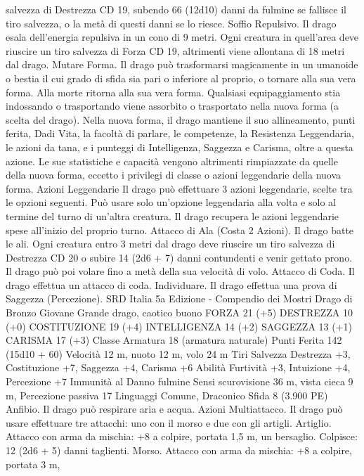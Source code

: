 \begin{multicols}{2}
salvezza di Destrezza CD 19, subendo 66 (12d10) danni da fulmine
se fallisce il tiro salvezza, o la metà di questi danni se lo riesce.
Soffio Repulsivo. Il drago esala dell’energia repulsiva in un cono di 9
metri. Ogni creatura in quell’area deve riuscire un tiro salvezza di
Forza CD 19, altrimenti viene allontana di 18 metri dal drago.
Mutare Forma. Il drago può trasformarsi magicamente in un
umanoide o bestia il cui grado di sfida sia pari o inferiore al proprio,
o tornare alla sua vera forma. Alla morte ritorna alla sua vera forma.
Qualsiasi equipaggiamento stia indossando o trasportando viene
assorbito o trasportato nella nuova forma (a scelta del drago).
Nella nuova forma, il drago mantiene il suo allineamento, punti
ferita, Dadi Vita, la facoltà di parlare, le competenze, la Resistenza
Leggendaria, le azioni da tana, e i punteggi di Intelligenza, Saggezza
e Carisma, oltre a questa azione. Le sue statistiche e capacità
vengono altrimenti rimpiazzate da quelle della nuova forma, eccetto i
privilegi di classe o azioni leggendarie della nuova forma.
Azioni Leggendarie
Il drago può effettuare 3 azioni leggendarie, scelte tra le opzioni
seguenti. Può usare solo un’opzione leggendaria alla volta e solo
al termine del turno di un’altra creatura. Il drago recupera le
azioni leggendarie spese all’inizio del proprio turno.
Attacco di Ala (Costa 2 Azioni). Il drago batte le ali. Ogni
creatura entro 3 metri dal drago deve riuscire un tiro salvezza di
Destrezza CD 20 o subire 14 (2d6 + 7) danni contundenti e venir
gettato prono. Il drago può poi volare fino a metà della sua
velocità di volo.
Attacco di Coda. Il drago effettua un attacco di coda.
Individuare. Il drago effettua una prova di Saggezza
(Percezione).
SRD Italia 5a Edizione - Compendio dei Mostri
Drago di Bronzo Giovane
Grande drago, caotico buono
FORZA 21 (+5)
DESTREZZA 10 (+0)
COSTITUZIONE 19 (+4)
INTELLIGENZA 14 (+2)
SAGGEZZA 13 (+1)
CARISMA 17 (+3)
Classe Armatura 18 (armatura naturale)
Punti Ferita 142 (15d10 + 60)
Velocità 12 m, nuoto 12 m, volo 24 m
Tiri Salvezza Destrezza +3, Costituzione +7, Saggezza +4,
Carisma +6
Abilità Furtività +3, Intuizione +4, Percezione +7
Immunità al Danno fulmine
Sensi scurovisione 36 m, vista cieca 9 m, Percezione passiva 17
Linguaggi Comune, Draconico
Sfida 8 (3.900 PE)
Anfibio. Il drago può respirare aria e acqua.
Azioni
Multiattacco. Il drago può usare effettuare tre attacchi: uno con
il morso e due con gli artigli.
Artiglio. Attacco con arma da mischia: +8 a colpire, portata 1,5
m, un bersaglio.
Colpisce: 12 (2d6 + 5) danni taglienti.
Morso. Attacco con arma da mischia: +8 a colpire, portata 3 m,

\end{multicols}
